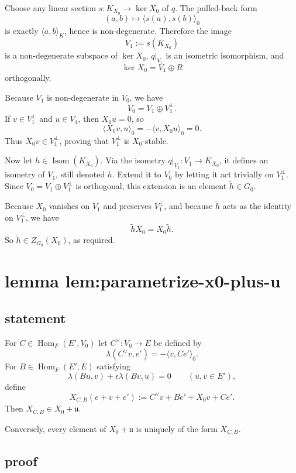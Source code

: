\documentclass[
  11pt,
]{article}
\begin{document}
Choose any linear section \(s:K_{X_0}\to \ker X_0\) of \(q\). The
pulled-back form \[
(a,b)\longmapsto \langle s(a),s(b)\rangle_0
\] is exactly \(\langle a,b\rangle_K\), hence is non-degenerate.
Therefore the image \[
V_1:=s(K_{X_0})
\] is a non-degenerate subspace of \(\ker X_0\), \(q|_{V_1}\) is an
isometric isomorphism, and \[
\ker X_0=V_1\oplus R
\] orthogonally.

Because \(V_1\) is non-degenerate in \(V_0\), we have \[
V_0=V_1\oplus V_1^\perp.
\] If \(v\in V_1^\perp\) and \(u\in V_1\), then \(X_0u=0\), so \[
\langle X_0v,u\rangle_0=-\langle v,X_0u\rangle_0=0.
\] Thus \(X_0v\in V_1^\perp\), proving that \(V_1^\perp\) is
\(X_0\)-stable.

Now let \(h\in \operatorname{Isom}(K_{X_0})\). Via the isometry
\(q|_{V_1}:V_1\to K_{X_0}\), it defines an isometry of \(V_1\), still
denoted \(h\). Extend it to \(V_0\) by letting it act trivially on
\(V_1^\perp\). Since \(V_0=V_1\oplus V_1^\perp\) is orthogonal, this
extension is an element \(\widetilde h\in G_0\).

Because \(X_0\) vanishes on \(V_1\) and preserves \(V_1^\perp\), and
because \(\widetilde h\) acts as the identity on \(V_1^\perp\), we have
\[
\widetilde h X_0 = X_0 \widetilde h.
\] So \(\widetilde h\in Z_{G_0}(X_0)\), as required.

\section{lemma
lem:parametrize-x0-plus-u}\label{lemma-lemparametrize-x0-plus-u}

\subsection{statement}\label{statement-1}

For \(C\in \operatorname{Hom}_F(E',V_0)\) let \(C^\vee:V_0\to E\) be
defined by \[
\lambda(C^\vee v,e')=-\langle v,Ce'\rangle_0.
\] For \(B\in \operatorname{Hom}_F(E',E)\) satisfying \[
\lambda(Bu,v)+\epsilon \lambda(Bv,u)=0
\qquad (u,v\in E'),
\] define \[
X_{C,B}(e+v+e'):=C^\vee v+Be'+X_0 v+Ce'.
\] Then \(X_{C,B}\in X_0+\mathfrak u\).

Conversely, every element of \(X_0+\mathfrak u\) is uniquely of the form
\(X_{C,B}\).

\subsection{proof}\label{proof-1}
\end{document}
